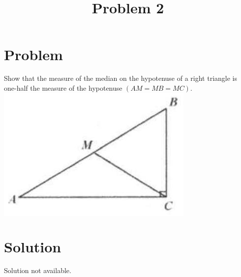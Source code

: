 \documentclass{article}
\title{Problem 2}
\date{}
\begin{document}
\maketitle

\section*{Problem}
Show that the measure of the median on the hypotenuse of a right triangle is one-half the measure of the hypotenuse \((A M=M B=M C)\).\\
\centering
\includegraphics[width=\textwidth]{images/088(3).jpg}

\section*{Solution}
Solution not available.
\end{document}
